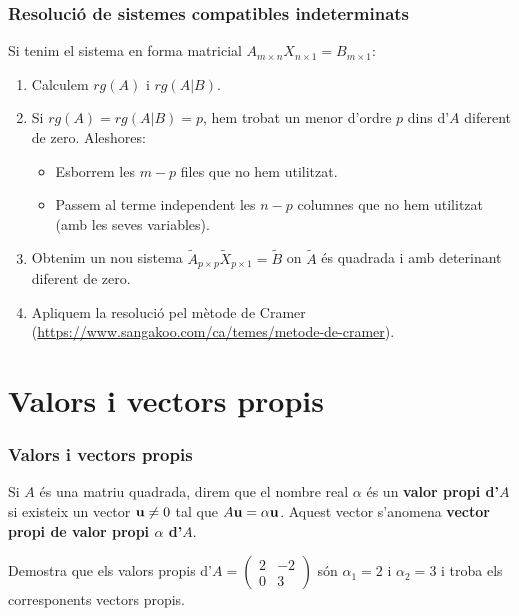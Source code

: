 \documentclass{beamer}
\begin{document}
\begin{frame}
  \frametitle{Resolució de sistemes compatibles indeterminats}
  Si tenim el sistema en forma matricial $A_{m \times n}X_{n \times 1}=B_{m \times 1}$:
  \begin{enumerate}
    \item Calculem $rg(A)$ i $rg(A|B)$.
    \item Si $rg(A)=rg(A|B)=p$, hem trobat un menor d'ordre $p$ dins d'$A$ diferent de zero. Aleshores:
    \begin{itemize}
      \item Esborrem les $m-p$ files que no hem utilitzat.
      \item Passem al terme independent les $n-p$ columnes que no hem utilitzat (amb les seves variables).
    \end{itemize}
    \item Obtenim un nou sistema $\tilde{A}_{p \times p}\tilde{X}_{p \times 1}=\tilde{B}$ on $\tilde{A}$ és quadrada i amb deterinant diferent de zero.
    \item Apliquem la resolució pel mètode de Cramer (\url{https://www.sangakoo.com/ca/temes/metode-de-cramer}).
  \end{enumerate}
\end{frame}
\section{Valors i vectors propis}

\begin{frame}
  \frametitle{Valors i vectors propis}
  Si $A$ és una matriu quadrada, direm que el nombre real $\alpha$ és un {\bf valor propi d'$A$} si existeix un vector $\textbf{u} \neq 0$ tal que $A\textbf{u}=\alpha \textbf{u}$. Aquest vector s'anomena {\bf vector propi de valor propi $\alpha$ d'$A$}.

  \begin{exercici}{}
    Demostra que els valors propis d'$A=\begin{pmatrix}2&-2\\0&3\end{pmatrix}$ són $\alpha_1=2$ i $\alpha_2=3$ i troba els corresponents vectors propis.
  \end{exercici}
\end{frame}
\end{document}
